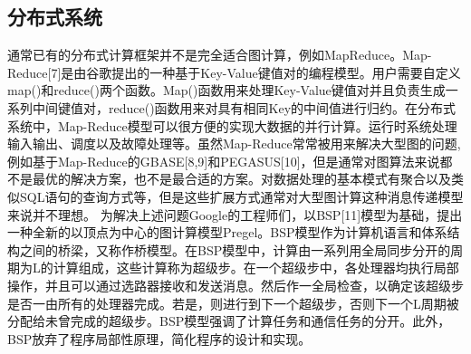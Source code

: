 \subsection{分布式系统}
通常已有的分布式计算框架并不是完全适合图计算，例如MapReduce。Map-Reduce[7]是由谷歌提出的一种基于Key-Value键值对的编程模型。用户需要自定义map()和reduce()两个函数。Map()函数用来处理Key-Value键值对并且负责生成一系列中间键值对，reduce()函数用来对具有相同Key的中间值进行归约。在分布式系统中，Map-Reduce模型可以很方便的实现大数据的并行计算。运行时系统处理输入输出、调度以及故障处理等。虽然Map-Reduce常常被用来解决大型图的问题,例如基于Map-Reduce的GBASE[8,9]和PEGASUS[10]，但是通常对图算法来说都不是最优的解决方案，也不是最合适的方案。对数据处理的基本模式有聚合以及类似SQL语句的查询方式等，但是这些扩展方式通常对大型图计算这种消息传递模型来说并不理想。
为解决上述问题Google的工程师们，以BSP[11]模型为基础，提出一种全新的以顶点为中心的图计算模型Pregel。BSP模型作为计算机语言和体系结构之间的桥梁，又称作桥模型。在BSP模型中，计算由一系列用全局同步分开的周期为L的计算组成，这些计算称为超级步。在一个超级步中，各处理器均执行局部操作，并且可以通过选路器接收和发送消息。然后作一全局检查，以确定该超级步是否一由所有的处理器完成。若是，则进行到下一个超级步，否则下一个L周期被分配给未曾完成的超级步。BSP模型强调了计算任务和通信任务的分开。此外，BSP放弃了程序局部性原理，简化程序的设计和实现。

